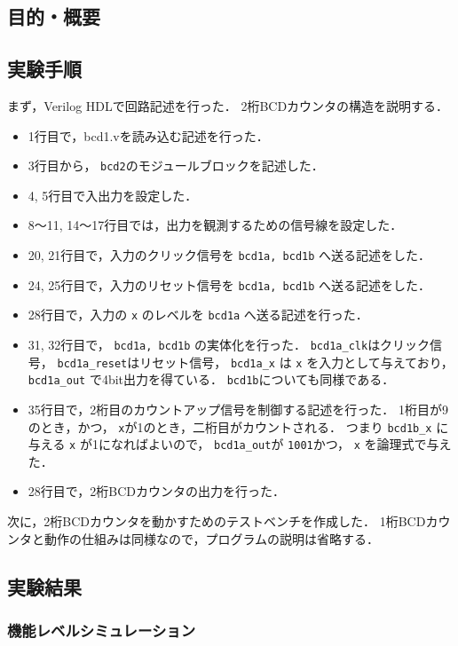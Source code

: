 \documentclass[uplatex]{jsarticle}
\begin{document}
\subsection{目的・概要}

\subsection{実験手順}

まず，Verilog HDLで回路記述を行った．
2桁BCDカウンタの構造を説明する．

\begin{itemize}
  \item 1行目で，bcd1.vを読み込む記述を行った．
  \item 3行目から， {\tt bcd2}のモジュールブロックを記述した．
  \item 4, 5行目で入出力を設定した．
  \item 8〜11, 14〜17行目では，出力を観測するための信号線を設定した．
  \item 20, 21行目で，入力のクリック信号を {\tt bcd1a, bcd1b} へ送る記述をした．
  \item 24, 25行目で，入力のリセット信号を {\tt bcd1a, bcd1b} へ送る記述をした．
  \item 28行目で，入力の {\tt x} のレベルを {\tt bcd1a} へ送る記述を行った．
  \item 
    31, 32行目で， {\tt bcd1a, bcd1b} の実体化を行った．
    {\tt bcd1a\_clk}はクリック信号， {\tt bcd1a\_reset}はリセット信号， {\tt bcd1a\_x} は {\tt x} を入力として与えており， {\tt bcd1a\_out} で4bit出力を得ている．
    {\tt bcd1b}についても同様である．
  \item 
    35行目で，2桁目のカウントアップ信号を制御する記述を行った．
    1桁目が9のとき，かつ， {\tt x}が1のとき，二桁目がカウントされる．
    つまり {\tt bcd1b\_x} に与える {\tt x} が1になればよいので， {\tt bcd1a\_out}が {\tt 1001}かつ， {\tt x} を論理式で与えた．
  \item
    28行目で，2桁BCDカウンタの出力を行った．
\end{itemize}

次に，2桁BCDカウンタを動かすためのテストベンチを作成した．
1桁BCDカウンタと動作の仕組みは同様なので，プログラムの説明は省略する．

\subsection{実験結果}

\subsubsection{機能レベルシミュレーション}
\end{document}
